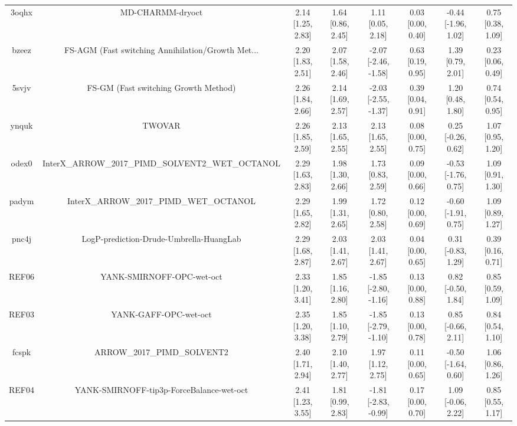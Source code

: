 \documentclass{article}
\begin{document}
\begin{center}
\begin{longtable}{|cccccccc|}
 3oqhx &                                   MD-CHARMM-dryoct &  2.14 [1.25, 2.83] &  1.64 [0.86, 2.45] &     1.11 [0.05, 2.18] &  0.03 [0.00, 0.40] &  -0.44 [-1.96, 1.02] &     0.75 [0.38, 1.09] \\
 bzeez &  FS-AGM (Fast switching Annihilation/Growth Met... &  2.20 [1.83, 2.51] &  2.07 [1.58, 2.46] &  -2.07 [-2.46, -1.58] &  0.63 [0.19, 0.95] &    1.39 [0.79, 2.01] &     0.23 [0.06, 0.49] \\
 5svjv &               FS-GM (Fast switching Growth Method) &  2.26 [1.84, 2.66] &  2.14 [1.69, 2.57] &  -2.03 [-2.55, -1.37] &  0.39 [0.04, 0.91] &    1.20 [0.48, 1.80] &     0.74 [0.54, 0.95] \\
 ynquk &                                             TWOVAR &  2.26 [1.85, 2.59] &  2.13 [1.65, 2.55] &     2.13 [1.65, 2.55] &  0.08 [0.00, 0.75] &   0.25 [-0.26, 0.62] &     1.07 [0.95, 1.20] \\
 odex0 &  InterX\_ARROW\_2017\_PIMD\_SOLVENT2\_WET\_OCTANOL &  2.29 [1.63, 2.83] &  1.98 [1.30, 2.66] &     1.73 [0.83, 2.59] &  0.09 [0.00, 0.66] &  -0.53 [-1.76, 0.75] &     1.09 [0.91, 1.30] \\
 padym &            InterX\_ARROW\_2017\_PIMD\_WET\_OCTANOL &  2.29 [1.65, 2.82] &  1.99 [1.31, 2.65] &     1.72 [0.80, 2.58] &  0.12 [0.00, 0.69] &  -0.60 [-1.91, 0.75] &     1.09 [0.89, 1.27] \\
 pnc4j &            LogP-prediction-Drude-Umbrella-HuangLab &  2.29 [1.68, 2.87] &  2.03 [1.41, 2.67] &     2.03 [1.41, 2.67] &  0.04 [0.00, 0.65] &   0.31 [-0.83, 1.29] &     0.39 [0.16, 0.71] \\
 REF06 &                          YANK-SMIRNOFF-OPC-wet-oct &  2.33 [1.20, 3.41] &  1.85 [1.16, 2.80] &  -1.85 [-2.80, -1.16] &  0.13 [0.00, 0.88] &   0.82 [-0.50, 1.84] &     0.85 [0.59, 1.09] \\
 REF03 &                              YANK-GAFF-OPC-wet-oct &  2.35 [1.20, 3.38] &  1.85 [1.10, 2.79] &  -1.85 [-2.79, -1.10] &  0.13 [0.00, 0.78] &   0.85 [-0.66, 2.11] &     0.84 [0.54, 1.10] \\
 fcspk &                        ARROW\_2017\_PIMD\_SOLVENT2 &  2.40 [1.71, 2.94] &  2.10 [1.40, 2.77] &     1.97 [1.12, 2.75] &  0.11 [0.00, 0.65] &  -0.50 [-1.64, 0.60] &     1.06 [0.86, 1.26] \\
 REF04 &           YANK-SMIRNOFF-tip3p-ForceBalance-wet-oct &  2.41 [1.23, 3.55] &  1.81 [0.99, 2.83] &  -1.81 [-2.83, -0.99] &  0.17 [0.00, 0.70] &   1.09 [-0.06, 2.22] &     0.85 [0.55, 1.17] \\

\end{longtable}
\end{center}
\end{document}
